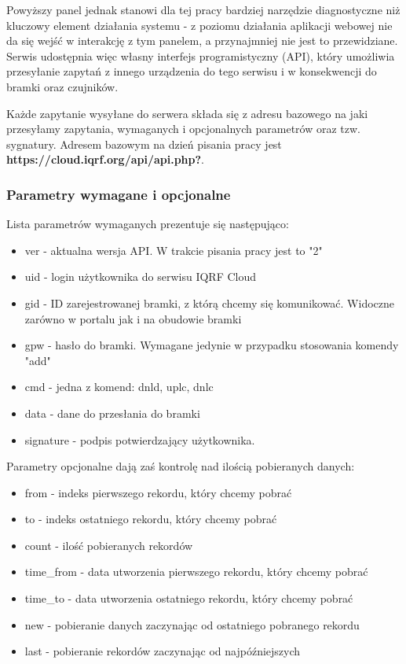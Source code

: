 \documentclass[a4paper, 12pt]{article}
\begin{document}
Powyższy panel jednak stanowi dla tej pracy bardziej narzędzie diagnostyczne niż kluczowy element działania systemu - z poziomu działania aplikacji
webowej nie da się wejść w interakcję z tym panelem, a przynajmniej nie jest to przewidziane. Serwis udostępnia więc własny interfejs 
programistyczny (API), który umożliwia przesyłanie zapytań z innego urządzenia do tego serwisu i w konsekwencji do bramki oraz czujników.

Każde zapytanie wysyłane do serwera składa się z adresu bazowego na jaki przesyłamy zapytania, wymaganych i opcjonalnych parametrów oraz tzw. 
sygnatury. Adresem bazowym na dzień pisania pracy jest \textbf{https://cloud.iqrf.org/api/api.php?}.

\subsubsection{Parametry wymagane i opcjonalne}

Lista parametrów wymaganych prezentuje się następująco:

\begin{itemize}
    \item ver - aktualna wersja API. W trakcie pisania pracy jest to "2" 
    \item uid - login użytkownika do serwisu IQRF Cloud
    \item gid - ID zarejestrowanej bramki, z którą chcemy się komunikować. Widoczne zarówno w portalu jak i na obudowie bramki
    \item gpw - hasło do bramki. Wymagane jedynie w przypadku stosowania komendy "add"
    \item cmd - jedna z komend: dnld, uplc, dnlc
    \item data - dane do przesłania do bramki
    \item signature - podpis potwierdzający użytkownika.
\end{itemize}

Parametry opcjonalne dają zaś kontrolę nad ilością pobieranych danych:

\begin{itemize}
    \item from - indeks pierwszego rekordu, który chcemy pobrać
    \item to - indeks ostatniego rekordu, który chcemy pobrać
    \item count - ilość pobieranych rekordów
    \item time\_from - data utworzenia pierwszego rekordu, który chcemy pobrać 
    \item time\_to - data utworzenia ostatniego rekordu, który chcemy pobrać
    \item new - pobieranie danych zaczynając od ostatniego pobranego rekordu
    \item last - pobieranie rekordów zaczynając od najpóźniejszych
\end{itemize}
\end{document}
